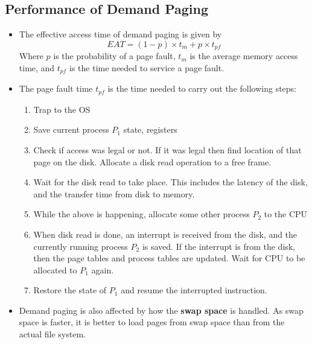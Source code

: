\documentclass{article}
\theoremstyle{plain}
\theoremstyle{definition}
\begin{document}
\subsection{Performance of Demand Paging}

\begin{itemize}
    \item The effective access time of demand paging is given by
    \begin{equation}
        EAT = (1-p)\times t_m + p\times t_{pf}
    \end{equation}
    Where $p$ is the probability of a page fault, $t_m$ is the average memory access time, and $t_{pf}$ is the time needed to service a page fault. 
    
    \item The page fault time $t_{pf}$ is the time needed to carry out the following steps:
    \begin{enumerate}
        \item Trap to the OS
        
        \item Save current process $P_1$ state, registers
        
        \item Check if access was legal or not. If it was legal then find location of that page on the disk. Allocate a disk read operation to a free frame.
        
        \item Wait for the disk read to take place. This includes the latency of the disk, and the transfer time from disk to memory.
        
        \item While the above is happening, allocate some other process $P_2$ to the CPU
        
        \item When disk read is done, an interrupt is received from the disk, and the currently running process $P_2$ is saved. If the interrupt is from the disk, then the page tables and process tables are updated. Wait for CPU to be allocated to $P_1$ again. 
        
        \item Restore the state of $P_1$ and resume the interrupted instruction.
    \end{enumerate}
    
    \item Demand paging is also affected by how the \textbf{swap space} is handled. As swap space is faster, it is better to load pages from swap space than from the actual file system. 
    

\end{itemize}
\end{document}
